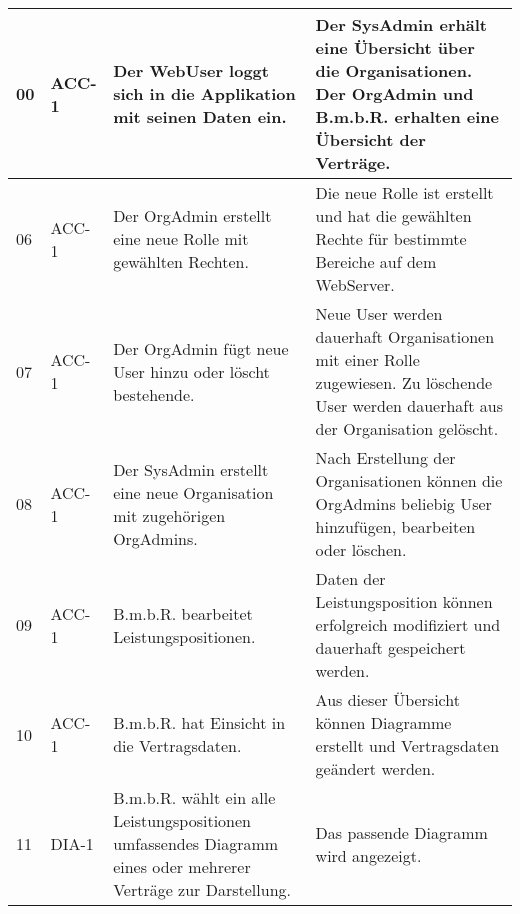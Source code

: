 \begin{longtable}[c]{|p{1cm}|p{3cm}|p{4cm}|p{6cm}|}
    00           & ACC-1                      & Der WebUser loggt sich in die Applikation mit seinen Daten ein.                                                    & Der SysAdmin erhält eine Übersicht über die Organisationen. Der OrgAdmin und B.m.b.R. erhalten eine Übersicht der Verträge. \\ \hline
    06           & ACC-1                      & Der OrgAdmin erstellt eine neue Rolle mit gewählten Rechten.                                                       & Die neue Rolle ist erstellt und hat die gewählten Rechte für bestimmte Bereiche auf dem WebServer.                                                                         \\ \hline
    07           & ACC-1                      & Der OrgAdmin fügt neue User hinzu oder löscht bestehende.                                                        & Neue User werden dauerhaft Organisationen mit einer Rolle zugewiesen. Zu löschende User werden dauerhaft aus der Organisation gelöscht.                                \\ \hline
    08           & ACC-1                      & Der SysAdmin erstellt eine neue Organisation mit zugehörigen OrgAdmins.                                            & Nach Erstellung der Organisationen können die OrgAdmins beliebig User hinzufügen, bearbeiten oder löschen.                                                               \\ \hline
    09           & ACC-1                      & B.m.b.R. bearbeitet Leistungspositionen.                                                                           & Daten der Leistungsposition können erfolgreich modifiziert und dauerhaft gespeichert werden.                                                                               \\ \hline
    10           & ACC-1                      & B.m.b.R. hat Einsicht in die Vertragsdaten.                                                                        & Aus dieser Übersicht können Diagramme erstellt und Vertragsdaten geändert werden.                                                                                          \\ \hline
    11           & DIA-1                      & B.m.b.R. wählt ein alle Leistungspositionen umfassendes Diagramm eines oder mehrerer Verträge zur Darstellung.     & Das passende Diagramm wird angezeigt.                                                                                                                                      \\ \hline

\end{longtable}
